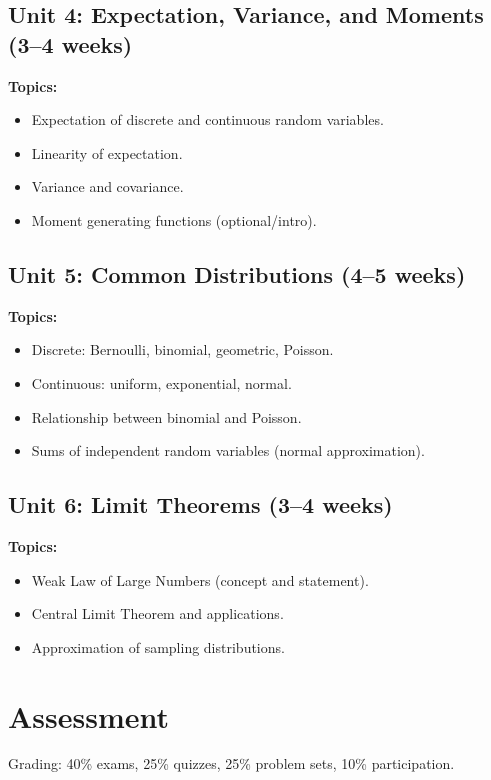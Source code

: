 \documentclass[12pt,oneside]{book}
\begin{document}
\subsection{Unit 4: Expectation, Variance, and Moments (3--4 weeks)}

\textbf{Topics:}
\begin{itemize}
    \item Expectation of discrete and continuous random variables.
    \item Linearity of expectation.
    \item Variance and covariance.
    \item Moment generating functions (optional/intro).
\end{itemize}

\subsection{Unit 5: Common Distributions (4--5 weeks)}

\textbf{Topics:}
\begin{itemize}
    \item Discrete: Bernoulli, binomial, geometric, Poisson.
    \item Continuous: uniform, exponential, normal.
    \item Relationship between binomial and Poisson.
    \item Sums of independent random variables (normal approximation).
\end{itemize}

\subsection{Unit 6: Limit Theorems (3--4 weeks)}

\textbf{Topics:}
\begin{itemize}
    \item Weak Law of Large Numbers (concept and statement).
    \item Central Limit Theorem and applications.
    \item Approximation of sampling distributions.
\end{itemize}

\section{Assessment}

Grading: 40\% exams, 25\% quizzes, 25\% problem sets, 10\% participation.
\end{document}
